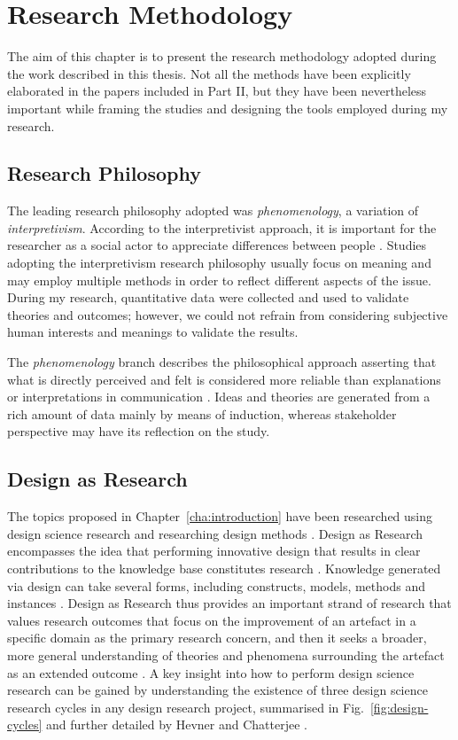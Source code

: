\chapter{Research Methodology}
\label{cha:research-methodology}

The aim of this chapter is to present the research methodology adopted during the work described in this thesis. Not all the methods have been explicitly elaborated in the papers included in Part II, but they have been nevertheless important while framing the studies and designing the tools employed during my research.


\section{Research Philosophy}

The leading research philosophy adopted was \textit{phenomenology}, a variation of \textit{interpretivism}. According to the interpretivist approach, it is important for the researcher as a social actor to appreciate differences between people \autocite{saunders_research_2009}. Studies adopting the interpretivism research philosophy usually focus on meaning and may employ multiple methods in order to reflect different aspects of the issue. During my research, quantitative data were collected and used to validate theories and outcomes; however, we could not refrain from considering subjective human interests and meanings to validate the results.

The \textit{phenomenology} branch describes the philosophical approach asserting that what is directly perceived and felt is considered more reliable than explanations or interpretations in communication \autocite{remenyi_doing_1998}. Ideas and theories are generated from a rich amount of data mainly by means of induction, whereas stakeholder perspective may have its reflection on the study.


\section{Design as Research}

The topics proposed in Chapter~\ref{cha:introduction} have been researched using design science research and researching design methods \autocite{hevner_design_2010}.
Design as Research encompasses the idea that performing innovative design that results in clear contributions to the knowledge base constitutes research \autocite{hevner_design_2010}. Knowledge generated via design can take several forms, including constructs, models, methods and instances \autocite{march_design_1995}.
Design as Research thus provides an important strand of research that values research outcomes that focus on the improvement of an artefact in a specific domain as the primary research concern, and then it seeks a broader, more general understanding of theories and phenomena surrounding the artefact as an extended outcome \autocite{hevner_design_2010}.
A key insight into how to perform design science research can be gained by understanding the existence of three design science research cycles in any design research project, summarised in Fig.~\ref{fig:design-cycles} and further detailed by Hevner and Chatterjee \autocite*{hevner_three_2007}.

